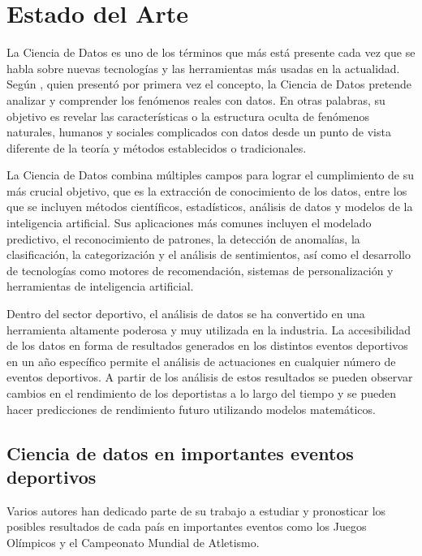 \chapter{Estado del Arte}\label{chapter:state-of-the-art}

La Ciencia de Datos es uno de los términos que más está presente cada vez que se habla sobre nuevas tecnologías y las herramientas más usadas en la actualidad. Según \cite{hayashi1998}, quien presentó por primera vez el concepto, la Ciencia de Datos pretende analizar y comprender los fenómenos reales con datos. En otras palabras, su objetivo es revelar las características o la estructura oculta de fenómenos naturales, humanos y sociales complicados con datos desde un punto de vista diferente de la teoría y métodos establecidos o tradicionales. 

La Ciencia de Datos combina múltiples campos para lograr el cumplimiento de su más crucial objetivo, que es la extracción de conocimiento de los datos, entre los que se incluyen métodos científicos, estadísticos, análisis de datos y modelos de la inteligencia artificial. Sus aplicaciones más comunes incluyen el modelado predictivo, el reconocimiento de patrones, la detección de anomalías, la clasificación, la categorización y el análisis de sentimientos, así como el desarrollo de tecnologías como motores de recomendación, sistemas de personalización y herramientas de inteligencia artificial.

Dentro del sector deportivo, el análisis de datos se ha convertido en una herramienta altamente poderosa y muy utilizada en la industria. La accesibilidad de los datos en forma de resultados generados en los distintos eventos deportivos en un año específico permite el análisis de actuaciones en cualquier número de eventos deportivos. A partir de los análisis de estos resultados se pueden observar cambios en el rendimiento de los deportistas a lo largo del tiempo y se pueden hacer predicciones de rendimiento futuro utilizando modelos matemáticos. 

\section{Ciencia de datos en importantes eventos deportivos}

Varios autores han dedicado parte de su trabajo a estudiar y pronosticar los posibles resultados de cada país en importantes eventos como los Juegos Olímpicos y el Campeonato Mundial de Atletismo.

